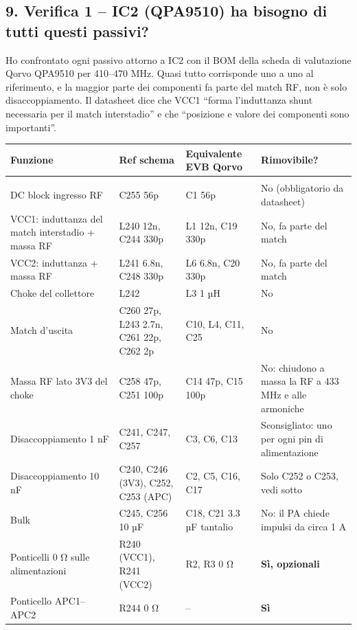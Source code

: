 \subsection[9. Verifica 1 – IC2 (QPA9510) ha bisogno di tutti questi passivi?]{9. Verifica 1 – IC2 (QPA9510) ha bisogno di tutti questi passivi? }

Ho confrontato ogni passivo attorno a IC2 con il BOM della scheda di valutazione Qorvo QPA9510 per 410–470 MHz. Quasi tutto corrisponde uno a uno al riferimento, e la maggior parte dei componenti fa parte del match RF, non è solo disaccoppiamento. Il datasheet dice che VCC1 \textquotedblleft{}forma l'induttanza shunt necessaria per il match interstadio\textquotedblright{} e che \textquotedblleft{}posizione e valore dei componenti sono importanti\textquotedblright{}.

{\footnotesize{}\setlength{\tabcolsep}{4pt}\renewcommand{\arraystretch}{1.1}
\begin{xltabular}{\linewidth}{>{\hsize\raggedright\arraybackslash}X>{\hsize\raggedright\arraybackslash}X>{\hsize\raggedright\arraybackslash}X>{\hsize\raggedright\arraybackslash}X}
\toprule
\textbf{Funzione} & \textbf{Ref schema} & \textbf{Equivalente EVB Qorvo} & \textbf{Rimovibile?} \\
\midrule
\endhead
\midrule[0.15pt]\\\bottomrule\endfoot
\bottomrule\endlastfoot
DC block ingresso RF & C255 56p & C1 56p & No (obbligatorio da datasheet) \\\midrule[0.15pt]
VCC1: induttanza del match interstadio + massa RF & L240 12n, C244 330p & L1 12n, C19 330p & No, fa parte del match \\\midrule[0.15pt]
VCC2: induttanza + massa RF & L241 6.8n, C248 330p & L6 6.8n, C20 330p & No, fa parte del match \\\midrule[0.15pt]
Choke del collettore & L242 & L3 1 µH & No \\\midrule[0.15pt]
Match d'uscita & C260 27p, L243 2.7n, C261 22p, C262 2p & C10, L4, C11, C25 & No \\\midrule[0.15pt]
Massa RF lato 3V3 del choke & C258 47p, C251 100p & C14 47p, C15 100p & No: chiudono a massa la RF a 433 MHz e alle armoniche \\\midrule[0.15pt]
Disaccoppiamento 1 nF & C241, C247, C257 & C3, C6, C13 & Sconsigliato: uno per ogni pin di alimentazione \\\midrule[0.15pt]
Disaccoppiamento 10 nF & C240, C246 (3V3), C252, C253 (APC) & C2, C5, C16, C17 & Solo C252 o C253, vedi sotto \\\midrule[0.15pt]
Bulk & C245, C256 10 µF & C18, C21 3.3 µF tantalio & No: il PA chiede impulsi da circa 1 A \\\midrule[0.15pt]
Ponticelli 0 Ω sulle alimentazioni & R240 (VCC1), R241 (VCC2) & R2, R3 0 Ω & \textbf{Sì, opzionali} \\\midrule[0.15pt]
Ponticello APC1–APC2 & R244 0 Ω & – & \textbf{Sì} \\
\end{xltabular}}

